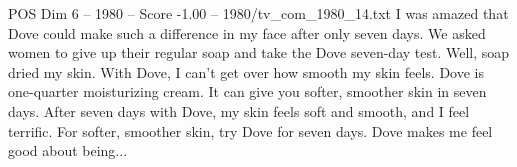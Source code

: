 \begin{textsample}{POS Dim 6 – 1980 – Score -1.00 – 1980/tv\_com\_1980\_14.txt}  \label{ex:f6_pos_060}
I was amazed that Dove could make such a difference in my face after only seven days.
We asked women to give up their regular soap and take the Dove seven-day test.
Well, soap dried my skin.
With Dove, I can't get over how smooth my skin feels.
Dove is one-quarter moisturizing cream.
It can give you softer, smoother skin in seven days.
After seven days with Dove, my skin feels soft and smooth, and I feel terrific.
For softer, smoother skin, try Dove for seven days.
Dove makes me feel good about being...

\end{textsample}
